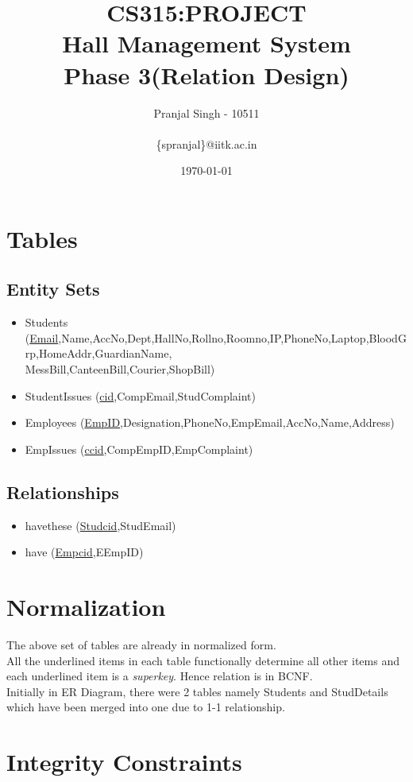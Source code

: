 \documentclass{article}
\title{\huge{CS315:PROJECT\\Hall Management System\\Phase 3(Relation Design)}}
\author{Pranjal Singh - 10511\\   \\ \{spranjal\}@iitk.ac.in}
\date{\today}
\begin{document}
\maketitle
\section{Tables}


\subsection{Entity Sets}

\begin{itemize}
\item Students (\uline{Email},Name,AccNo,Dept,HallNo,Rollno,Roomno,IP,PhoneNo,Laptop,BloodGrp,HomeAddr,GuardianName,\\MessBill,CanteenBill,Courier,ShopBill)
\item StudentIssues (\uline{cid},CompEmail,StudComplaint)
\item Employees (\uline{EmpID},Designation,PhoneNo,EmpEmail,AccNo,Name,Address)
\item EmpIssues (\uline{ccid},CompEmpID,EmpComplaint)
\end{itemize}

\subsection{Relationships}

\begin{itemize}
\item havethese (\uline{Studcid},StudEmail)
\item have (\uline{Empcid},EEmpID)
\end{itemize}


\section{Normalization}
The above set of tables are already in normalized form.\\
All the underlined items in each table functionally determine all other items and each underlined item is a \emph{superkey}. Hence relation is in BCNF.\\
Initially in ER Diagram, there were 2 tables namely Students and StudDetails which have been merged into one due to 1-1 relationship.

\section{Integrity Constraints}
\end{document}
